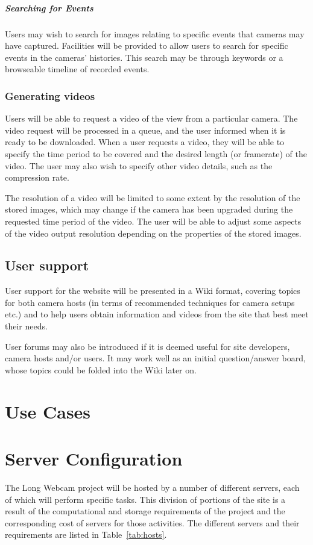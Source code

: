 \documentclass[11pt]{article}
\begin{document}
\subparagraph{Searching for Events} Users may wish to search for images relating to specific events that cameras may have captured. Facilities will be provided to allow users to search for specific events in the cameras' histories. This search may be through keywords or a browseable timeline of recorded events.


\subsubsection{Generating videos}
\label{generate_video}
Users will be able to request a video of the view from a particular camera. The video request will be processed in a queue, and the user informed when it is ready to be downloaded. When a user requests a video, they will be able to specify the time period to be covered and the desired length (or framerate) of the video. The user may also wish to specify other video details, such as the compression rate.

The resolution of a video will be limited to some extent by the resolution of the stored images, which may change if the camera has been upgraded during the requested time period of the video. The user will be able to adjust some aspects of the video output resolution depending on the properties of the stored images.

\subsection{User support}
User support for the website will be presented in a Wiki format, covering topics for both camera hosts (in terms of recommended techniques for camera setups etc.) and to help users obtain information and videos from the site that best meet their needs.

User forums may also be introduced if it is deemed useful for site developers, camera hosts and/or users. It may work well as an initial question/answer board, whose topics could be folded into the Wiki later on.

\clearpage
\section{Use Cases}
\label{sec:use_cases}

\section{Server Configuration}
The Long Webcam project will be hosted by a number of different servers, each of which will perform specific tasks. This division of portions of the site is a result of the computational and storage requirements of the project and the corresponding cost of servers for those activities. The different servers and their requirements are listed in Table~\ref{tab:hosts}.
\end{document}
